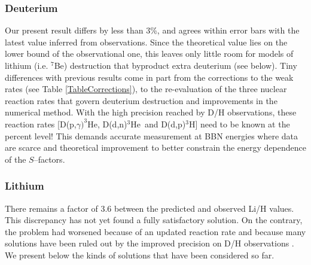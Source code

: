 \documentclass[onecolumn,float,floatfix,preprintnumbers,aps,rmp,nofootinbib,amsmath,amssymb,amsfonts,superscriptaddress,tightenlines]{revtex4}
\newcommand{\bery}{$^{7}$Be}
\newcommand{\ddn}{{D(d,n)$^3$He}}
\newcommand{\ddp}{{D(d,p)$^3$H}}
\newcommand{\dpg}{{D(p,$\gamma)^3$He}}
\newcommand{\sfac}{$S$--factor}
\begin{document}
\subsubsection{Deuterium}

Our present result differs by less than 3\%, and agrees within error bars with the latest value inferred from \citet{Coo18} observations.
Since the theoretical value lies on the lower bound of the observational one, this leaves only little room for models of lithium (i.e. \bery)
destruction that byproduct extra deuterium (see below). 
Tiny differences with previous results \cite{Coc15} come in part from the corrections to the weak rates (see Table \ref{TableCorrections}),
to the re-evaluation of the three nuclear reaction rates \citep{Bayes16,Bayes17} that govern deuterium destruction and improvements
in the numerical method. With the high precision reached by D/H observations, these reaction rates [\dpg, \ddn\ and \ddp] need to 
be known at the percent level! 
This demands accurate measurement at BBN energies where data are scarce and theoretical improvement to better constrain
the energy dependence of the \sfac{s}. 


\subsubsection{Lithium}

There remains a factor of 3.6 between the predicted and observed Li/H values. This discrepancy has not yet found a fully 
satisfactory solution. On the contrary, the problem had worsened because of an updated reaction rate \citep{Cyb08a,Cyb08b} and
because many solutions have been ruled out by the improved precision on D/H observations \citep{Coo18}. 
We present below the kinds of solutions that have been considered so far. 
\end{document}
